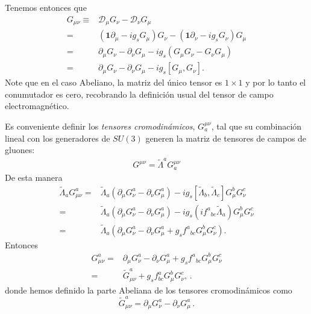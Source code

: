 \begin{frame}
Tenemos entonces que %
\begin{align}
  G_{\mu\nu}\equiv & \mathcal{D}_{\mu} G_{\nu}-\mathcal{D}_{\nu} G_{\mu} \nonumber\\
=&\left( \mathbf{1}\partial_{\mu}-i g_s G_{\mu} \right)G_{\nu}-
\left( \mathbf{1}\partial_{\nu}-i g_s G_{\nu} \right)G_{\mu}\nonumber\\
=& \partial_{\mu}G_{\nu}-\partial_{\nu}G_{\mu}
-ig_s \left(  G_{\mu}G_{\nu}-G_{\nu}G_{\mu}  \right) \nonumber\\
=& \partial_{\mu}G_{\nu}-\partial_{\nu}G_{\mu}
-ig_s \left[  G_{\mu},G_{\nu}  \right] .
\end{align}
Note que en el caso Abeliano, la matriz del único tensor es $1\times1$ y por lo tanto el conumutador es cero, recobrando la definición usual del tensor de campo electromagnético.

Es conveniente definir los \emph{tensores cromodinámicos}, $G^{\mu\nu}_a$, tal que su combinación lineal con los generadores de $SU(3)$ generen la matriz de tensores de campos de gluones:
\begin{align}
\label{eq:Gmunu}
G^{\mu\nu}=\widetilde{\Lambda}^aG^{\mu\nu}_a
\end{align}
De esta manera
\begin{align}
  \widetilde{\Lambda}_a G_{\mu\nu}^a=& \widetilde{\Lambda}_a
\left( \partial_{\mu}G_{\nu}^{a}-\partial_{\nu}G_{\mu}^{a}  \right)
-i g_s \left[ \widetilde{\Lambda}_b,\widetilde{\Lambda}_c \right]G_{\mu}^{b}G_{\nu}^{c} \nonumber\\
=&\widetilde{\Lambda}_a
\left( \partial_{\mu}G_{\nu}^{a}-\partial_{\nu}G_{\mu}^{a}  \right)
-i g_s \left(i {f^{a}}_{bc} \widetilde{\Lambda}_a \right)G_{\mu}^{b}G_{\nu}^{c} \nonumber\\
=&\widetilde{\Lambda}_a \left(  \partial_{\mu}G_{\nu}^{a}-\partial_{\nu}G_{\mu}^{a} 
+g_s  {f^{a}}_{bc} G_{\mu}^{b}G_{\nu}^{c}\right).
\end{align}
Entonces
\begin{align}
  \label{eq:258qft}
  G_{\mu\nu}^a=&\partial_{\mu}G_{\nu}^{a}-\partial_{\nu}G_{\mu}^{a}+
g_s{f^{a}}_{bc}G_{\mu}^{b}G_{\nu}^{c} \nonumber\\
=&\widetilde{G}_{\mu\nu}^a+g_s f^a_{bc}G_\mu^b G_\nu^c,\,.
\end{align}
donde hemos definido la parte Abeliana de los tensores cromodinámicos como
\begin{equation}
  \widetilde{G}_{\mu\nu}^a=\partial_\mu G_\nu^a-\partial_\nu G_\mu^a\,.
\end{equation}




\end{frame}
